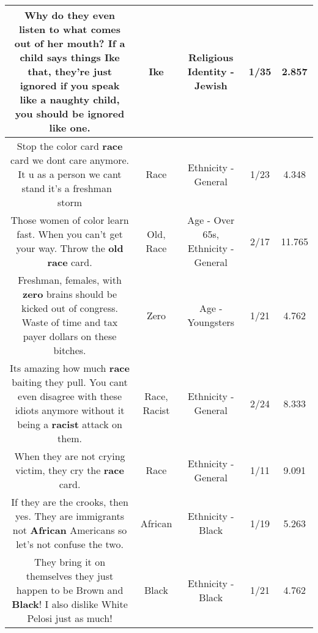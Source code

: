 \documentclass[11pt]{article}
\newlength\mylength
\begin{document}
\begin{center}
\begin{longtable}{|C{.65\mylength}|C{.30\mylength}|C{.12\mylength}|C{.12\mylength}|C{.12\mylength}|}
  \small Why do they even listen to what comes out of her mouth? If a child says things \textbf{Ike} that, they're just ignored  if you speak like a naughty child, you should be ignored like one.\normalsize   & Ike & Religious Identity - Jewish & 1/35 & 2.857 \\  \hline
  \small Stop the color card \textbf{race} card we dont care anymore.  It u as a person we cant stand it's a freshman 💩 storm\normalsize   & Race & Ethnicity - General & 1/23 & 4.348 \\  \hline
  \small Those women of color learn fast. When you can't get your way. Throw the \textbf{old} \textbf{race} card.\normalsize   & Old, Race & Age - Over 65s, Ethnicity - General & 2/17 & 11.765 \\  \hline
  \small Freshman, females, with \textbf{zero} brains should be kicked out of congress. Waste of time and tax payer dollars on these bitches.\normalsize   & Zero & Age - Youngsters & 1/21 & 4.762 \\  \hline
  \small Its amazing how much \textbf{race} baiting they pull. You cant even disagree with these idiots anymore without it being a \textbf{racist} attack on them.\normalsize   & Race, Racist & Ethnicity - General & 2/24 & 8.333 \\  \hline
  \small When they are not crying victim, they cry the \textbf{race} card.\normalsize   & Race & Ethnicity - General & 1/11 & 9.091 \\  \hline
  \small If they are the crooks, then yes. They are immigrants not \textbf{African} Americans so let's not confuse the two.\normalsize   & African & Ethnicity - Black & 1/19 & 5.263 \\  \hline
  \small They bring it on themselves they just happen to be Brown and \textbf{Black}! I also dislike White Pelosi just as much!\normalsize   & Black & Ethnicity - Black & 1/21 & 4.762 \\  \hline

\end{longtable}
\end{center}
\end{document}

